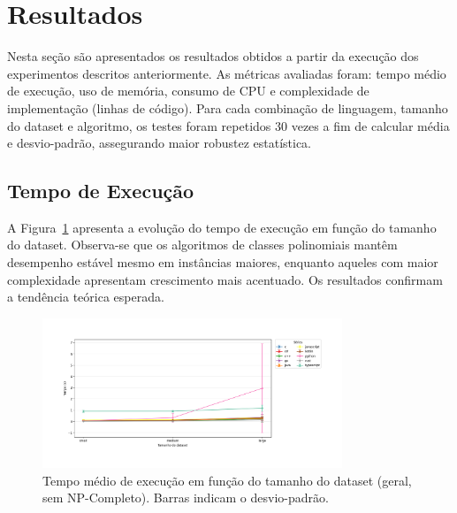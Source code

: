 \documentclass[12pt, a4paper]{article}
\begin{document}
\section{Resultados}

Nesta seção são apresentados os resultados obtidos a partir da execução dos experimentos descritos anteriormente. As métricas avaliadas foram: tempo médio de execução, uso de memória, consumo de CPU e complexidade de implementação (linhas de código). Para cada combinação de linguagem, tamanho do dataset e algoritmo, os testes foram repetidos 30 vezes a fim de calcular média e desvio-padrão, assegurando maior robustez estatística.

\subsection{Tempo de Execução}

A Figura~\ref{fig:tempo_execucao} apresenta a evolução do tempo de execução em função do tamanho do dataset. Observa-se que os algoritmos de classes polinomiais mantêm desempenho estável mesmo em instâncias maiores, enquanto aqueles com maior complexidade apresentam crescimento mais acentuado. Os resultados confirmam a tendência teórica esperada.

\begin{figure}[H]
    \centering
    \includegraphics[width=0.8\textwidth]{img/tempo_vs_tamanho_all.png}
    \caption{Tempo médio de execução em função do tamanho do dataset (geral, sem NP-Completo). Barras indicam o desvio-padrão.}
    \label{fig:tempo_execucao}
\end{figure}
\end{document}
